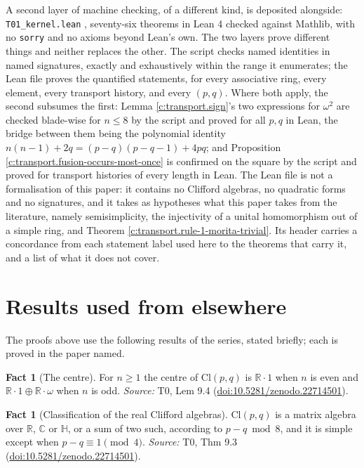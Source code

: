 \documentclass[11pt]{article}
\theoremstyle{definition}
\newtheorem{fact}[theorem]{Fact}
\theoremstyle{plain}
\providecommand{\C}{}\renewcommand{\C}{\mathbb{C}}
\providecommand{\Cl}{}\renewcommand{\Cl}{\mathrm{Cl}}
\providecommand{\HH}{}\renewcommand{\HH}{\mathbb{H}}
\providecommand{\R}{}\renewcommand{\R}{\mathbb{R}}
\begin{document}
A second layer of machine checking, of a different kind, is deposited alongside: \texttt{T01\_kernel.lean} \cite{ButlerKernelT01}, seventy-six theorems in Lean 4 checked against Mathlib, with no \texttt{sorry} and no axioms beyond Lean's own. The two layers prove different things and neither replaces the other. The script checks named identities in named signatures, exactly and exhaustively within the range it enumerates; the Lean file proves the quantified statements, for every associative ring, every element, every transport history, and every $(p,q)$. Where both apply, the second subsumes the first: Lemma \ref{c:transport.sign}'s two expressions for $\omega^2$ are checked blade-wise for $n \leq 8$ by the script and proved for all $p,q$ in Lean, the bridge between them being the polynomial identity $n(n-1) + 2q = (p-q)(p-q-1) + 4pq$; and Proposition \ref{c:transport.fusion-occurs-most-once} is confirmed on the square by the script and proved for transport histories of every length in Lean. The Lean file is not a formalisation of this paper: it contains no Clifford algebras, no quadratic forms and no signatures, and it takes as hypotheses what this paper takes from the literature, namely semisimplicity, the injectivity of a unital homomorphism out of a simple ring, and Theorem \ref{c:transport.rule-1-morita-trivial}. Its header carries a concordance from each statement label used here to the theorems that carry it, and a list of what it does not cover.

\section{Results used from elsewhere}
The proofs above use the following results of the series, stated briefly; each is proved in the paper named.

\begin{fact}[The centre]\label{c:primer.centre}
For $n \geq 1$ the centre of $\Cl(p,q)$ is $\R \cdot 1$ when $n$ is even and $\R \cdot 1 \oplus \R \cdot \omega$ when $n$ is odd.
\emph{Source:} T0, Lem 9.4 (\href{https://doi.org/10.5281/zenodo.22714501}{doi:10.5281/zenodo.22714501}).
\end{fact}

\begin{fact}[Classification of the real Clifford algebras]\label{c:primer.classification-real-clifford-algebras}
$\Cl(p,q)$ is a matrix algebra over $\R$, $\C$ or $\HH$, or a sum of two such, according to $p - q \bmod 8$, and it is simple except when $p - q \equiv 1 \pmod 4$.
\emph{Source:} T0, Thm 9.3 (\href{https://doi.org/10.5281/zenodo.22714501}{doi:10.5281/zenodo.22714501}).
\end{fact}
\end{document}
